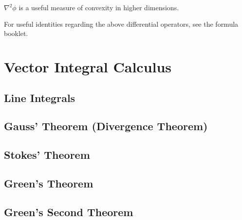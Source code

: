 $\nabla^2 \phi$ is a useful measure of convexity in higher dimensions.
\vspace{\baselineskip}

For useful identities regarding the above differential operators, see the formula booklet.

\section{Vector Integral Calculus}

\subsection*{Line Integrals}

\subsection*{Gauss' Theorem (Divergence Theorem)}
\subsection*{Stokes' Theorem}
\subsection*{Green's Theorem}
\subsection*{Green's Second Theorem}